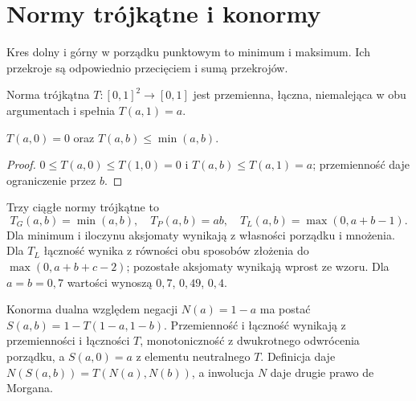 \section{Normy trójkątne i konormy}
Kres dolny i górny w porządku punktowym to minimum i maksimum.
Ich przekroje są odpowiednio przecięciem i sumą przekrojów.
\begin{definicja}\label{def:lst-fuzzy-tnorm}
Norma trójkątna $T:[0,1]^2\to[0,1]$ jest przemienna,
łączna, niemalejąca w obu argumentach i spełnia $T(a,1)=a$.
\end{definicja}
\begin{lemat}\label{lem:lst-fuzzy-tnorm-bound}
$T(a,0)=0$ oraz $T(a,b)\leq\min(a,b)$.
\end{lemat}
\begin{proof}
$0\leq T(a,0)\leq T(1,0)=0$ i $T(a,b)\leq T(a,1)=a$;
przemienność daje ograniczenie przez $b$.
\end{proof}
\begin{przyklad}\label{ex:lst-fuzzy-three-tnorms}
Trzy ciągłe normy trójkątne to
\[
T_G(a,b)=\min(a,b),\quad T_P(a,b)=ab,\quad
T_L(a,b)=\max(0,a+b-1).
\]
Dla minimum i iloczynu aksjomaty wynikają z własności porządku
i mnożenia. Dla $T_L$ łączność wynika z równości obu sposobów
złożenia do $\max(0,a+b+c-2)$; pozostałe aksjomaty wynikają wprost
ze wzoru. Dla $a=b=0{,}7$ wartości wynoszą $0{,}7$, $0{,}49$, $0{,}4$.
\end{przyklad}
Konorma dualna względem negacji $N(a)=1-a$ ma postać
$S(a,b)=1-T(1-a,1-b)$. Przemienność i łączność wynikają z
przemienności i łączności $T$, monotoniczność z dwukrotnego
odwrócenia porządku, a $S(a,0)=a$ z elementu neutralnego $T$.
Definicja daje $N(S(a,b))=T(N(a),N(b))$, a inwolucja $N$
daje drugie prawo de Morgana.


